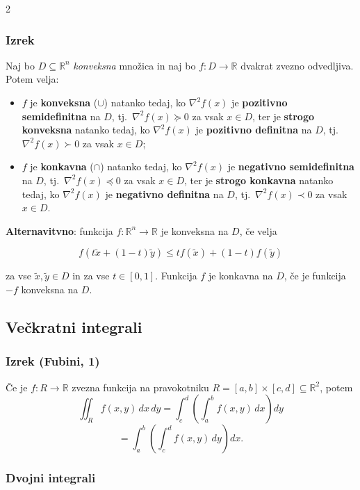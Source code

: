 \documentclass{article}
\begin{document}
\begin{multicols}{2}
	\subsubsection{Izrek}
	Naj bo $D \subseteq \mathbb{R}^n$ \emph{konveksna} množica in naj bo $f: D \to \mathbb{R}$ dvakrat zvezno odvedljiva. Potem velja:
	\begin{itemize}
		\item $f$ je \textbf{konveksna} ($\cup$) natanko tedaj, ko $\nabla^2 f(x)$ je \textbf{pozitivno semidefinitna} na $D$, tj.\ $\nabla^2 f(x) \succeq 0$ za vsak $x \in D$,
		      ter je \textbf{strogo konveksna} natanko tedaj, ko $\nabla^2 f(x)$ je \textbf{pozitivno definitna} na $D$, tj.\ $\nabla^2 f(x) \succ 0$ za vsak $x \in D$;
		\item $f$ je \textbf{konkavna} ($\cap$) natanko tedaj, ko $\nabla^2 f(x)$ je \textbf{negativno semidefinitna} na $D$, tj.\ $\nabla^2 f(x) \preceq 0$ za vsak $x \in D$,
		      ter je \textbf{strogo konkavna} natanko tedaj, ko $\nabla^2 f(x)$ je \textbf{negativno definitna} na $D$, tj.\ $\nabla^2 f(x) \prec 0$ za vsak $x \in D$.
	\end{itemize}
	\textbf{Alternavitvno}: funkcija \( f: \mathbb{R}^n \rightarrow \mathbb{R} \) je konveksna na \( D \), če velja

	\[
		f(t \tilde{x} + (1-t) \tilde{y}) \leq t f(\tilde{x}) + (1-t) f(\tilde{y})
	\]

	za vse \( \tilde{x}, \tilde{y} \in D \) in za vse \( t \in [0, 1] \). Funkcija \( f \) je konkavna na \( D \), če je funkcija \( -f \) konveksna na \( D \).

	\subsection{Večkratni integrali}

	\subsubsection{Izrek (Fubini, 1)}
	Če je \( f: R \rightarrow \mathbb{R} \) zvezna funkcija na pravokotniku \( R = [a, b] \times [c, d] \subseteq \mathbb{R}^2 \), potem
	\[
		\iint_R f(x,y) \,dx\,dy = \int_c^d \left( \int_a^b f(x,y) \,dx \right) dy
	\]
	\[
		= \int_a^b \left( \int_c^d f(x,y) \,dy \right) dx.
	\]


	\subsubsection{Dvojni integrali}


\end{multicols}
\end{document}
